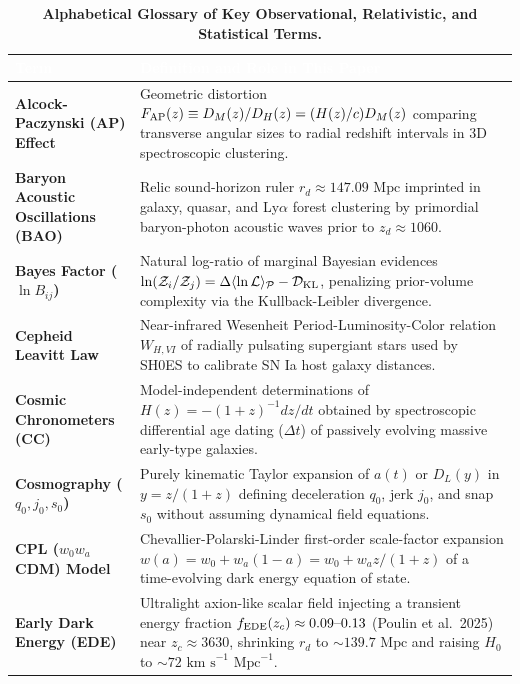 \documentclass[aps,prd,preprint,superscriptaddress,nofootinbib]{revtex4-2}
\begin{document}
\begin{table}[!htbp]
\centering
\caption{\textbf{Alphabetical Glossary of Key Observational, Relativistic, and Statistical Terms.}}
\label{m:tab:glossary_terms}
\footnotesize
\renewcommand{\arraystretch}{1.22}
\begin{tabularx}{\textwidth}{>{\bfseries\color{primary}}p{} X}
\toprule
\rowcolor{primary} \textcolor{white}{\textbf{Term}} & \textcolor{white}{\textbf{Definition and Role in This Paper}} \\
\midrule
Alcock-Paczynski (AP) Effect & Geometric distortion $F_{\rm AP}(z) \equiv D_M(z)/D_H(z) = (H(z)/c)D_M(z)$ comparing transverse angular sizes to radial redshift intervals in 3D spectroscopic clustering. \\
Baryon Acoustic Oscillations (BAO) & Relic sound-horizon ruler $r_d \approx 147.09\text{ Mpc}$ imprinted in galaxy, quasar, and Ly$\alpha$ forest clustering by primordial baryon-photon acoustic waves prior to $z_d \approx 1060$. \\
Bayes Factor ($\ln B_{ij}$) & Natural log-ratio of marginal Bayesian evidences $\ln(\mathcal{Z}_i/\mathcal{Z}_j) = \Delta\langle\ln\mathcal{L}\rangle_{\mathcal{P}} - \mathcal{D}_{\rm KL}$, penalizing prior-volume complexity via the Kullback-Leibler divergence. \\
Cepheid Leavitt Law & Near-infrared Wesenheit Period-Luminosity-Color relation $W_{H,VI}$ of radially pulsating supergiant stars used by SH0ES to calibrate SN Ia host galaxy distances. \\
Cosmic Chronometers (CC) & Model-independent determinations of $H(z) = -(1+z)^{-1}dz/dt$ obtained by spectroscopic differential age dating ($\Delta t$) of passively evolving massive early-type galaxies. \\
Cosmography ($q_0, j_0, s_0$) & Purely kinematic Taylor expansion of $a(t)$ or $D_L(y)$ in $y = z/(1+z)$ defining deceleration $q_0$, jerk $j_0$, and snap $s_0$ without assuming dynamical field equations. \\
CPL ($w_0 w_a$CDM) Model & Chevallier-Polarski-Linder first-order scale-factor expansion $w(a) = w_0 + w_a(1-a) = w_0 + w_a z/(1+z)$ of a time-evolving dark energy equation of state. \\
Early Dark Energy (EDE) & Ultralight axion-like scalar field injecting a transient energy fraction $f_{\rm EDE}(z_c) \approx 0.09\text{--}0.13$ (Poulin et al.\ 2025) near $z_c \approx 3630$, shrinking $r_d$ to $\sim 139.7\text{ Mpc}$ and raising $H_0$ to $\sim 72\text{ km s}^{-1}\text{ Mpc}^{-1}$. \\

\end{tabularx}
\end{table}
\end{document}
